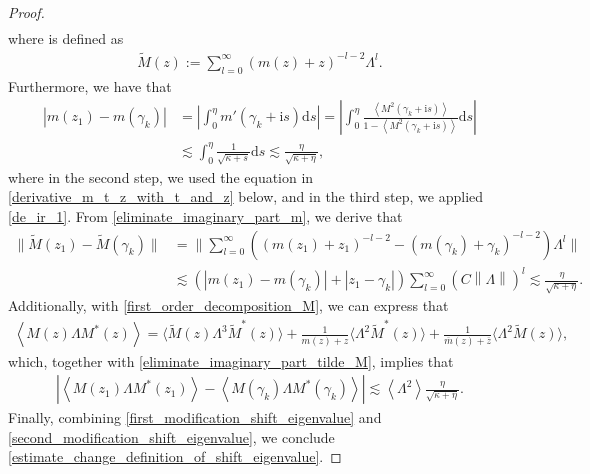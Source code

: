 \documentclass[10pt,reqno]{amsart}
\numberwithin{equation}{section}
\numberwithin{figure}{section}
\theoremstyle{plain} %
\theoremstyle{definition} %
\renewcommand{\r}{\mathrm} \newcommand{\rr}{\mathrm} %
\newcommand{\wt}{\widetilde}
\renewcommand{\tilde}{\wt}
\renewcommand{\Bar}{\overline}
\newcommand{\p}[1]{({#1})}
\newcommand{\pa}[1]{\left({#1}\right)}
\newcommand{\absa}[1]{\left\lvert #1 \right\rvert}
\newcommand{\norm}[1]{\lVert #1 \rVert}
\newcommand{\norma}[1]{\left\lVert #1 \right\rVert}
\newcommand{\avg}[1]{\langle #1 \rangle}
\newcommand{\avga}[1]{\left\langle #1 \right\rangle}
\newcommand{\rd}{\mathrm{d}}
\numberwithin{equation}{section}
\begin{document}
\begin{proof}
\begin{equation}
\begin{aligned}
        \end{aligned}
    \end{equation}
    where \smash{$\tilde{M} (z)$} is defined as
    \begin{equation}\nonumber
        \begin{aligned}
            \tilde{M} (z) :=\sum_{l=0}^{\infty}\pa{m (z) +z}^{-l-2}\Lambda^{l}.
        \end{aligned}
    \end{equation}
    Furthermore, we have that   \begin{equation}\label{eliminate_imaginary_part_m}
        \begin{aligned}
            \absa{m(z_1)-m\pa{\gamma_k}}&=\absa{\int_{0}^{\eta} m'\pa{\gamma_k+\r i s} \rd s}= \absa{\int_{0}^{\eta} \frac{\avga{M^2\pa{\gamma_k+\r i s} }}{1-\avga{M^2\pa{\gamma_k+\r i s}}} \rd s} \\
            &\lesssim  \int_{0}^{\eta} \frac{1}{\sqrt{\kappa+s}}\r d s\lesssim \frac{\eta}{\sqrt{\kappa+\eta}},
        \end{aligned}
    \end{equation}
    where in the second step, we used the equation in \eqref{derivative_m_t_z_with_t_and_z} below, and in the third step, we applied \eqref{de_ir_1}. From \eqref{eliminate_imaginary_part_m}, we derive that
\begin{equation}\label{eliminate_imaginary_part_tilde_M}
        \begin{aligned}
            \norm{\tilde{M}(z_1)-\tilde{M}\p{\gamma_k}}&=\bigg\|{\sum_{l=0}^{\infty}\pa{\pa{m(z_1)+z_1}^{-l-2}-\pa{m(\gamma_k)+\gamma_k}^{-l-2}}\Lambda^{l}}\bigg\|\\
            &\lesssim \pa{\absa{m(z_1)-m(\gamma_k)}+\absa{z_1-\gamma_k}}\sum_{l=0}^{\infty}\pa{C\norma{\Lambda}}^l\lesssim \frac{\eta}{\sqrt{\kappa+\eta}}.
        \end{aligned}
    \end{equation}
Additionally, with \eqref{first_order_decomposition_M}, we can express that
    \begin{equation}\nonumber
        \begin{aligned}
            \avga{M (z) \Lambda M^{*} (z) }=\avg{\tilde{M} (z) \Lambda^3\tilde{M}^{*} (z) }+\frac{1}{m (z) +z}\avg{\Lambda^2 \tilde{M}^{*} (z) }+\frac{1}{\Bar{m} (z) +\Bar{z}}\avg{\Lambda^2 \tilde{M} (z) },
        \end{aligned}
    \end{equation}
    which, together with \eqref{eliminate_imaginary_part_tilde_M}, implies that
    \begin{equation}\label{second_modification_shift_eigenvalue}
        \begin{aligned}
            \absa{\avga{M(z_1)\Lambda M^{*}(z_1)}-\avga{M\p{\gamma_k}\Lambda M^{*}\p{\gamma_k}}}\lesssim \avga{\Lambda^2}\frac{\eta}{\sqrt{\kappa+\eta}}.
        \end{aligned}
    \end{equation}
Finally, combining \eqref{first_modification_shift_eigenvalue} and \eqref{second_modification_shift_eigenvalue}, we conclude \eqref{estimate_change_definition_of_shift_eigenvalue}.
    

\end{proof}
\end{document}
